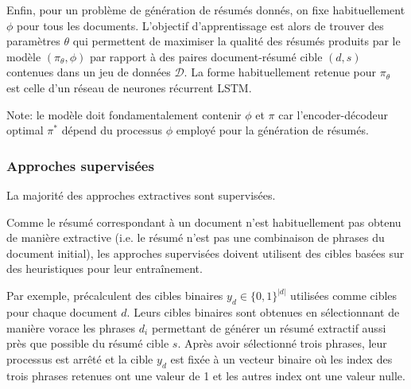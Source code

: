 Enfin, pour un problème de génération de résumés donnés, on fixe habituellement $\phi$
pour tous les documents.
L'objectif d'apprentissage est alors de trouver des paramètres $\theta$
qui permettent de maximiser la qualité des résumés produits par le modèle
$(\pi_\theta, \phi)$ par rapport à des paires document-résumé cible $(d, s)$ contenues
dans un jeu de données $\mathcal{D}$.
La forme habituellement retenue pour $\pi_\theta$ est celle d'un réseau de neurones
récurrent LSTM.

Note: le modèle doit fondamentalement contenir $\phi$ et $\pi$ car
l'encoder-décodeur optimal $\pi^*$ dépend du processus $\phi$ employé
pour la génération de résumés.


\subsubsection*{Approches supervisées}

La majorité des approches extractives sont supervisées.

Comme le résumé correspondant à un document n'est habituellement pas obtenu de
manière extractive (i.e. le résumé n'est pas une combinaison de phrases du document initial),
les approches supervisées doivent utilisent des cibles basées sur des heuristiques pour
leur entraînement.

Par exemple, \citet{10.5555/3298483.3298681} précalculent des cibles binaires $y_d \in \{0,1\}^{|d|}$
utilisées comme cibles pour chaque document $d$.
Leurs cibles binaires sont obtenues en sélectionnant de manière vorace
les phrases $d_i$ permettant de générer un résumé extractif aussi près que possible
du résumé cible $s$.
Après avoir sélectionné trois phrases, leur processus est arrêté et la cible $y_d$
est fixée à un vecteur binaire où les index des trois phrases retenues ont une valeur
de 1 et les autres index ont une valeur nulle.

